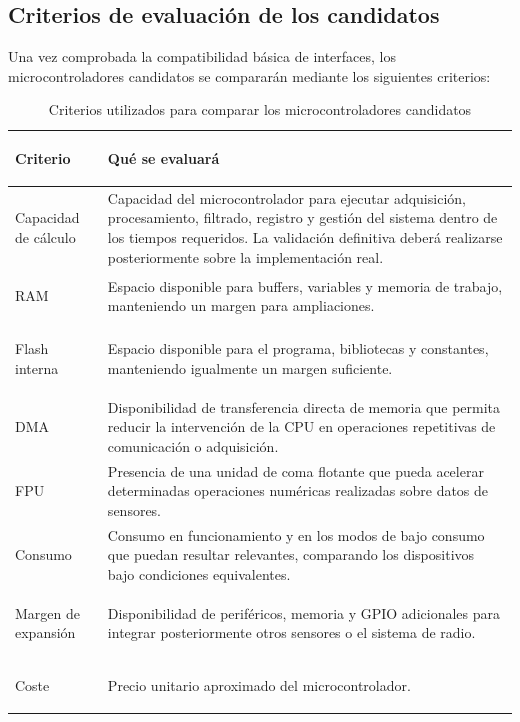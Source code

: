 \documentclass[11pt,a4paper]{article}
\begin{document}
\subsection{Criterios de evaluación de los candidatos}

Una vez comprobada la compatibilidad básica de interfaces, los
microcontroladores candidatos se compararán mediante los siguientes
criterios:

\begin{table}[H]

\centering
\renewcommand{\arraystretch}{1.3}

\begin{tabularx}{\textwidth}{
    >{\bfseries\raggedright\arraybackslash}p{4cm}
    >{\raggedright\arraybackslash}X
}

\toprule
Criterio & Qué se evaluará \\
\midrule

Capacidad de cálculo &
Capacidad del microcontrolador para ejecutar adquisición, procesamiento,
filtrado, registro y gestión del sistema dentro de los tiempos requeridos.
La validación definitiva deberá realizarse posteriormente sobre la
implementación real. \\

RAM &
Espacio disponible para buffers, variables y memoria de trabajo,
manteniendo un margen para ampliaciones. \\

Flash interna &
Espacio disponible para el programa, bibliotecas y constantes,
manteniendo igualmente un margen suficiente. \\



DMA &
Disponibilidad de transferencia directa de memoria que permita reducir
la intervención de la CPU en operaciones repetitivas de comunicación o
adquisición. \\

FPU &
Presencia de una unidad de coma flotante que pueda acelerar determinadas
operaciones numéricas realizadas sobre datos de sensores. \\

Consumo &
Consumo en funcionamiento y en los modos de bajo consumo que puedan
resultar relevantes, comparando los dispositivos bajo condiciones
equivalentes. \\

Margen de expansión &
Disponibilidad de periféricos, memoria y GPIO adicionales para integrar
posteriormente otros sensores o el sistema de radio. \\

Coste &
Precio unitario aproximado del microcontrolador. \\
\bottomrule

\end{tabularx}

\caption{Criterios utilizados para comparar los microcontroladores candidatos}%
\label{tab:criterios_microcontrolador}

\end{table}
\end{document}
